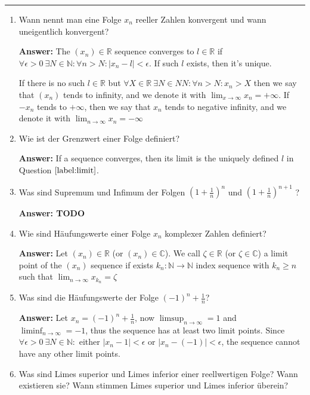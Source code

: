 \documentclass[11pt]{article}
\newcommand{\abs}[1]{\left|#1\right|}
\newcommand{\RR}[0]{\mathbb{R}}
\newcommand{\CC}[0]{\mathbb{C}}
\newcommand{\NN}[0]{\mathbb{N}}
\begin{document}


\medskip\hrule
\begin{enumerate}
    \item \label{label:limit} Wann nennt man eine Folge $x_n$ reeller Zahlen konvergent und wann uneigentlich konvergent?
    
    \textbf{Answer:} The $(x_n) \in \RR$ sequence converges to $l \in \RR$ if $\forall \epsilon >0~\exists N \in \NN\colon \forall n > N\colon \abs{x_n - l} < \epsilon$. If such $l$ exists, then it's unique. 
    
    If there is no such $l \in \RR$ but $\forall X \in \RR~\exists N \in NN\colon \forall n > N\colon x_n > X$ then we say that $(x_n)$ tends to infinity, and we denote it with $\lim_{x\to\infty} x_n = +\infty$. If $-x_n$ tends to $+\infty$, then we say that $x_n$ tends to negative infinity, and we denote it with $\lim_{n\to\infty}x_n = -\infty$

    \item Wie ist der Grenzwert einer Folge definiert?
    
    \textbf{Answer:} If a sequence converges, then its limit is the uniquely defined $l$ in Question $\ref{label:limit}$.
    \item Was sind Supremum und Infimum der Folgen $(1 + \frac{1}{n})^n$ und $(1 + \frac{1}{n} )^{n+1}$ ?
    
    \textbf{Answer: TODO}
    \item Wie sind Häufungswerte einer Folge $x_n$ komplexer Zahlen definiert?
    
    \textbf{Answer:} 
    Let $(x_n) \in \RR$ (or $(x_n) \in \CC$). We call $\zeta \in \RR$ (or $\zeta \in \CC$) a limit point of the $(x_n)$ sequence if exists $k_n\colon\NN \to \NN$ index sequence with $k_n \ge n$ such that $\lim_{n\to\infty}x_{k_n} = \zeta$

    \item Was sind die Häufungswerte der Folge $(-1)^n + \frac{1}{n}$?
    
    \textbf{Answer:} Let $x_n = (-1)^n + \frac{1}{n}$, now $\limsup_{n\to\infty} = 1$ and $\liminf_{n\to\infty} = -1$, thus the sequence has at least two limit points. Since $\forall \epsilon > 0~\exists N \in \NN\colon$ either $\abs{x_n - 1} < \epsilon$ or $\abs{x_n - (-1)} < \epsilon$, the sequence cannot have any other limit points.

    \item Was sind Limes superior und Limes inferior einer reellwertigen Folge? Wann existieren sie? Wann stimmen Limes superior und Limes inferior überein?
    

\end{enumerate}
\end{document}
